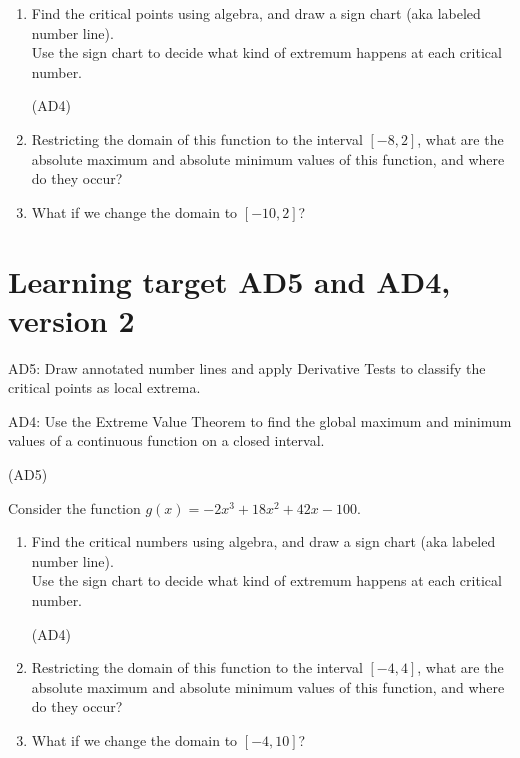 	\begin{enumerate}[leftmargin=15pt]

		\item Find the critical points using algebra, and draw a sign chart (aka labeled number line). \\
		Use the sign chart to decide what kind of extremum happens at each critical number.

		\vfill
		\vfill
	
		\hrulefill (AD4)
		\item Restricting the domain of this function to the interval $[-8, 2]$, what are the absolute maximum and absolute minimum values of this function, and where do they occur?

		\vfill
	
		
		\item What if we change the domain to $[-10, 2]$?
		
		\vfill
	
	\end{enumerate}

\pagebreak

\section{Learning target AD5 and AD4, version 2}

AD5: Draw annotated number lines and apply Derivative Tests to classify the critical points as local extrema.

AD4: Use the Extreme Value Theorem to find the global maximum and minimum values of a continuous function on a closed interval.

\hrulefill (AD5)

Consider the function
\(g(x) =-2x^{3}+18x^{2}+42x-100\).
	
	\begin{enumerate}[leftmargin=15pt]

		\item Find the critical numbers using algebra, and draw a sign chart (aka labeled number line). \\
		Use the sign chart to decide what kind of extremum happens at each critical number.

		\vfill
		\vfill
	
		\hrulefill (AD4)
		\item Restricting the domain of this function to the interval $[-4, 4]$, what are the absolute maximum and absolute minimum values of this function, and where do they occur?

		\vfill
	
		
		\item What if we change the domain to $[-4,10]$?
		
		\vfill
	
	\end{enumerate}
\pagebreak

